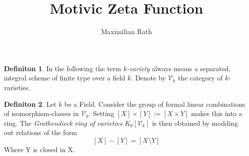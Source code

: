 \documentclass[a4paper]{article}
\title{Motivic Zeta Function}
\author{Maximilian Rath}
\theoremstyle{plain}
\theoremstyle{definition}
\newtheorem{definition}{Definiton}
\begin{document}
\begin{definition}
    In the following the term \emph{$k$-variety} always means a separated, integral scheme of finite type over a field $k$.
    Denote by $\mathcal{V}_k$ the category of $k$-varieties.
\end{definition}

\begin{definition}
    Let $k$ be a Field. Consider the group of formal linear combinations of isomorphism-classes in $\mathcal{V}_k$.
    Setting $[X] \times [Y] := [X \times Y]$ makes this into a ring.
    The \emph{Grothendieck ring of varieties} $K_0[\mathcal{V}_k]$ is then obtained by modding out relations of the form
    \[
        [X] - [Y] = [X \setminus Y]
    \]
    Where Y is closed in X.
\end{definition}
\end{document}
